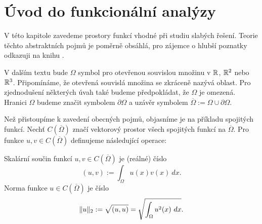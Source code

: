 \section{Úvod do funkcionální analýzy}


V této kapitole zavedeme prostory funkcí vhodné při studiu slabých řešení.
Teorie těchto abstraktních pojmů je poměrně obsáhlá, pro zájemce o hlubší poznatky odkazuji na knihu \cite{rektorys1974variacni}.


V dalším textu bude $\Omega$ symbol pro otevřenou souvislou množinu v $\mathbb R$, $\mathbb R^2$ nebo $\mathbb R^3$.
Připomínáme, že otevřená souvislá množina se zkráceně nazývá oblast.
Pro zjednodušení některých úvah také budeme předpokládat, že $\Omega$ je omezená.
Hranici $\Omega$ budeme značit symbolem $\partial\Omega$ a uzávěr symbolem $\overline\Omega:=\Omega\cup\partial\Omega$.

Než přistoupíme k zavedení obecných pojmů, objasníme je na příkladu spojitých funkcí.
Nechť $C(\overline\Omega)$ značí vektorový prostor všech spojitých funkcí na $\overline\Omega$.
Pro funkce $u,v\in C(\overline\Omega)$ definujeme následující operace:

\begin{df}
\label{df:scal_norm_met_C}
Skalární součin funkcí $u,v\in C(\overline\Omega)$ je (reálné) číslo
\[ (u,v):=\int_\Omega u(x) v(x)~dx. \]
Norma funkce $u\in C(\overline\Omega)$ je číslo
\[ \|u\|_2 := \sqrt{(u,u)} = \sqrt{\int_\Omega u^2(x)~dx}. \]
\end{df}

